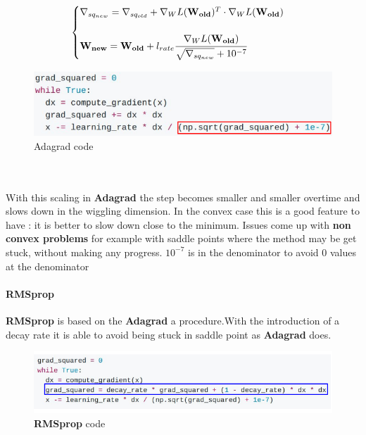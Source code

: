 \documentclass[11pt]{article}
\begin{document}
\begin{minipage}{0.5\textwidth}
\begin{equation}
\begin{cases}
\nabla_{sq_{new}} = \nabla_{sq_{old}} + \nabla_W L(\mathbf{W_{old}})^T\cdot \nabla_W L(\mathbf{W_{old}}) \\\\
\mathbf{W_{new}} = \mathbf{W_{old}}+l_{rate}
 \cfrac{\nabla_W L(\mathbf{W_{old}})}{\sqrt{\nabla_{sq_{new}}}+10^{-7}}
 \end{cases}
\end{equation}{}
\end{minipage}
\begin{minipage}{0.5\textwidth}
\begin{figure} [H]
\centering 
\includegraphics[scale=0.60]{L615.pdf}
\caption{ Adagrad code}
\label{fig:L615}
\end{figure}
\end{minipage}\\\\
With this scaling in \textbf{Adagrad } the step  becomes smaller and smaller overtime and slows down in the wiggling dimension. In the convex case this is a good feature to have : it is better to slow down close to the minimum. Issues come up with \textbf{non convex problems} for example  with saddle points where the method may be get stuck, without making any progress. $10^{-7}$ is in the denominator to avoid $0$ values at the denominator
\paragraph{RMSprop}
\textbf{RMSprop} is based on the \textbf{Adagrad } a procedure.With the introduction of a decay rate it is able to avoid being stuck in saddle point as \textbf{Adagrad } does. 
\begin{figure}[h]
\centering
\captionsetup{justification=centering}
\includegraphics[width=0.9\linewidth]{L616.pdf}
\caption{ \textbf{RMSprop} code}
\label{fig:L616}
\end{figure}
\end{document}
